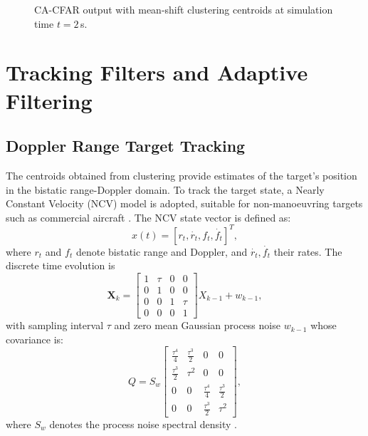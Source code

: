 \documentclass[conference]{IEEEtran}
\begin{document}
\begin{figure}[t]
  \centering
  
  \caption{CA-CFAR output with mean-shift clustering centroids at simulation time $t = 2$\,s.}
  \label{fig:cfar_centroids}
\end{figure}

\section{Tracking Filters and Adaptive Filtering}

\subsection{Doppler Range Target Tracking}

The centroids obtained from clustering provide estimates of the target's position in the bistatic range-Doppler domain. To track the target state, a Nearly Constant Velocity (NCV) model is adopted, suitable for non-manoeuvring targets such as commercial aircraft \cite{Li2003a}. The NCV state vector is defined as:
\begin{equation}
  x(t) = [r_t, \dot{r_t}, f_t, \dot{f_t}]^T,
\end{equation}
where $r_t$ and $f_t$ denote bistatic range and Doppler, and $\dot{r_t}, \dot{f_t}$ their rates. The discrete time evolution is
\begin{equation}
  \mathbf{X}_k =
  \begin{bmatrix}
      1 & \tau & 0 & 0 \\
      0 & 1 & 0 & 0 \\
      0 & 0 & 1 & \tau \\
      0 & 0 & 0 & 1
  \end{bmatrix} X_{k-1} + w_{k-1},
\end{equation}
with sampling interval $\tau$ and zero mean Gaussian process noise $w_{k-1}$ whose covariance is:
\begin{equation}
  Q = S_w
  \begin{bmatrix}
      \tfrac{\tau^4}{4} & \tfrac{\tau^3}{2} & 0 & 0 \\
      \tfrac{\tau^3}{2} & \tau^2 & 0 & 0 \\
      0 & 0 & \tfrac{\tau^4}{4} & \tfrac{\tau^3}{2} \\
      0 & 0 & \tfrac{\tau^3}{2} & \tau^2
  \end{bmatrix},
\end{equation}
where $S_w$ denotes the process noise spectral density \cite{Measurements2023b}.
\end{document}
